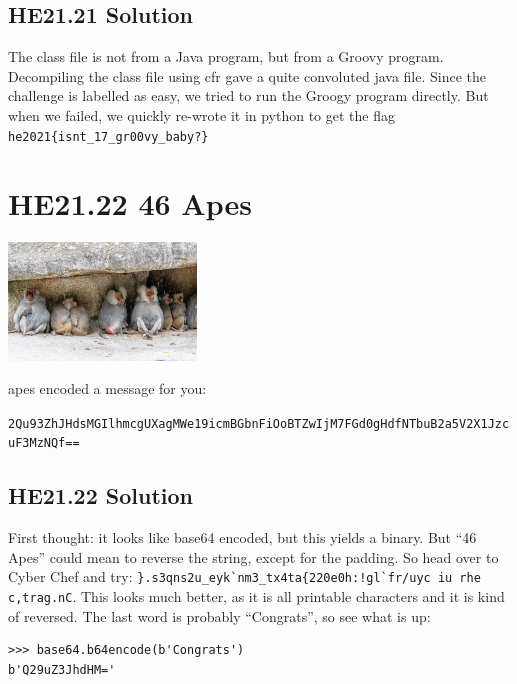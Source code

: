 \documentclass[english,a4paper,nols,noindent]{tufte-handout}
\begin{document}
\hypertarget{he21.21-solution}{%
\subsection{HE21.21 Solution}\label{he21.21-solution}}

\noindent The class file is not from a Java program, but from a Groovy
program.  Decompiling the class file using cfr gave a quite convoluted
java file.  Since the challenge is labelled as easy, we tried to run
the Groogy program directly.  But when we failed, we quickly re-wrote
it in python to get the flag \verb+he2021{isnt_17_gr00vy_baby?}+


\hypertarget{he21.22}{%
  \section{HE21.22 46 Apes}
  \label{he21.22}}
\begin{marginfigure}
    \includegraphics[width=50mm]{images/challenge22.jpg}
\end{marginfigure}

 apes encoded a message for you:

\verb+2Qu93ZhJHdsMGIlhmcgUXagMWe19icmBGbnFiOoBTZwIjM7FGd0gHdfNTbuB2a5V2X1JzcuF3MzNQf==+

\hypertarget{he21.22-solution}{%
\subsection{HE21.22 Solution}\label{he21.22-solution}}

\noindent First thought: it looks like base64 encoded, but this yields a binary.  But ``46 Apes'' could mean to reverse the string, except for the padding.  So head over to Cyber Chef and try: \verb+}.s3qns2u_eyk`nm3_tx4ta{220e0h:!gl`fr/uyc iu rhe c,trag.nC+. This looks much better, as it is all printable characters and it is kind of reversed.  The last word is probably ``Congrats'', so see what is up:

\begin{verbatim}
>>> base64.b64encode(b'Congrats')
b'Q29uZ3JhdHM='
\end{verbatim}
\end{document}
